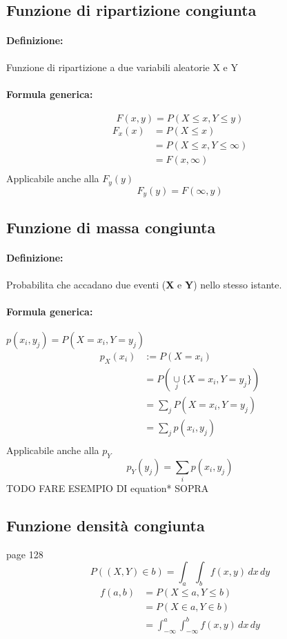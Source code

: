 \documentclass[]{article}
\newcommand{\definizione}{\paragraph{Definizione:}}
\newcommand{\formula}{\paragraph{Formula generica:}}
\begin{document}
    \subsection{Funzione di ripartizione congiunta}
    \definizione Funzione di ripartizione a due variabili aleatorie X e Y
    \formula \[ F(x, y) = P(X \leq x, Y \leq y) \]
    \begin{equation*}
    \begin{split}
        F_x(x) & = P(X \leq x) \\
        & = P(X \leq x, Y \leq \infty) \\
        & = F(x, \infty) \\
    \end{split}
    \end{equation*}
    Applicabile anche alla $F_y(y)$
    \[ F_y(y) = F(\infty, y) \]

    \subsection{Funzione di massa congiunta}
    \definizione Probabilita che accadano due eventi (\textbf{X} e \textbf{Y}) nello stesso istante.
    \formula $ p(x_i, y_j) = P(X=x_i, Y=y_j) $ \\

    \begin{equation*}
        \begin{split}
            p_X(x_i) & := P(X = x_i) \\ 
            & = P(\underset{j}{\cup} \{ X=x_i, Y=y_j \}) \\
            & = \sum_{j}^{} P(X=x_i, Y=y_j) \\ 
            & = \sum_{j}^{} p(x_i, y_j) \\
        \end{split}
    \end{equation*}
    Applicabile anche alla $p_Y$
    \[ p_Y(y_j) = \sum_{i}^{} p(x_i, y_j) \]
    TODO FARE ESEMPIO DI equation* SOPRA


    \subsection{Funzione densità congiunta}
    page 128
    \[ P((X,Y) \in b) = \int_{a}^{} \int_{b}^{} f(x,y) \, dx \, dy \]
    \begin{equation*}
        \begin{split}
            f(a,b) & = P(X \leq a, Y \leq b) \\
            & = P(X \in a, Y \in b) \\
            & = \int_{-\infty}^{a} \int_{-\infty}^{b} f(x,y) \, dx \, dy \\
        \end{split}
    \end{equation*}
\end{document}
